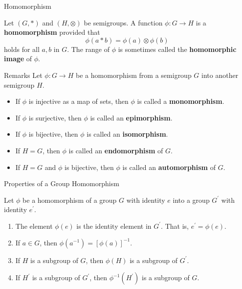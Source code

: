 \documentclass{beamer}
\begin{document}
\begin{frame}{Homomorphism}
\begin{definition}
\justifying
Let $(G, *)$ and $(H, \otimes)$ be semigroups. A function $\phi: G \rightarrow H$ is a \textbf{homomorphism} provided that
\[
\phi(a * b) = \phi(a) \otimes \phi(b)
\]
holds for all $a, b$ in $G$. The range of $\phi$ is sometimes called the \textbf{homomorphic image} of $\phi$.
\end{definition}        
\end{frame}

\begin{frame}{Remarks}
\justifying
Let $\phi: G \rightarrow H$ be a homomorphism from a semigroup $G$ into another semigroup $H$.
\begin{itemize}
\justifying
\item If $\phi$ is injective as a map of sets, then $\phi$ is called a \textbf{monomorphism}.
\item If $\phi$ is surjective, then $\phi$ is called an \textbf{epimorphism}.
\item If $\phi$ is bijective, then $\phi$ is called an \textbf{isomorphism}.
\item If $H = G$, then $\phi$ is called an \textbf{endomorphism} of $G$.
\item If $H = G$ and $\phi$ is bijective, then $\phi$ is called an \textbf{automorphism} of $G$.
\end{itemize}    
\end{frame}

\begin{frame}{Properties of a Group Homomorphism}
\begin{theorem}
\justifying
Let $\phi$ be a homomorphism of a group $G$ with identity $e$ into a group $G^{\prime}$ with identity $e^{\prime}$.
\begin{enumerate}
\justifying
\item The element $\phi(e)$ is the identity element in $G^{\prime}$. That is, $e^{\prime} = \phi(e)$. 
\item If $a \in G$, then $\phi\left(a^{-1}\right) = [\phi(a)]^{-1}$.
\item If $H$ is a subgroup of $G$, then $\phi(H)$ is a subgroup of $G^{\prime}$.
\item If $H^{\prime}$ is a subgroup of $G^{\prime}$, then $\phi^{-1}\left(H^{\prime}\right)$ is a subgroup of $G$.
\end{enumerate}
\end{theorem}    
\end{frame}
\end{document}
